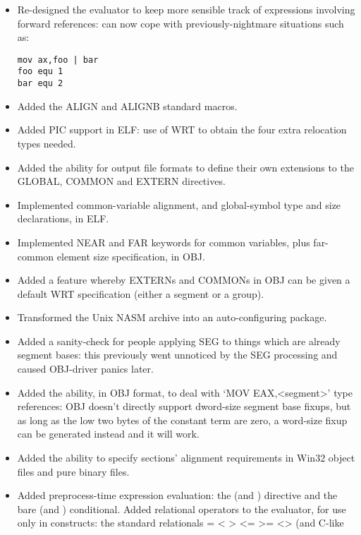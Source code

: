 \begin{itemize}
{        prints them, so that it can report errors more sanely.}
    \item{Re-designed the evaluator to keep more sensible track of expressions
        involving forward references: can now cope with previously-nightmare
        situations such as:
\begin{lstlisting}
mov ax,foo | bar
foo equ 1
bar equ 2
\end{lstlisting}}
    \item{Added the ALIGN and ALIGNB standard macros.}
    \item{Added PIC support in ELF: use of WRT to obtain the four extra
        relocation types needed.}
    \item{Added the ability for output file formats to define their own
        extensions to the GLOBAL, COMMON and EXTERN directives.}
    \item{Implemented common-variable alignment, and global-symbol type and
        size declarations, in ELF.}
    \item{Implemented NEAR and FAR keywords for common variables, plus
        far-common element size specification, in OBJ.}
    \item{Added a feature whereby EXTERNs and COMMONs in OBJ can be given a
        default WRT specification (either a segment or a group).}
    \item{Transformed the Unix NASM archive into an auto-configuring package.}
    \item{Added a sanity-check for people applying SEG to things which are
        already segment bases: this previously went unnoticed by the SEG
        processing and caused OBJ-driver panics later.}
    \item{Added the ability, in OBJ format, to deal with `MOV EAX,<segment>'
        type references: OBJ doesn't directly support dword-size segment
        base fixups, but as long as the low two bytes of the constant term
        are zero, a word-size fixup can be generated instead and it will
        work.}
    \item{Added the ability to specify sections' alignment requirements in
        Win32 object files and pure binary files.}
    \item{Added preprocess-time expression evaluation: the  (and
        ) directive and the bare  (and ) conditional.
        Added relational operators to the evaluator, for use only in 
        constructs: the standard relationals = < > <= >= <> (and C-like
}
\end{itemize}
